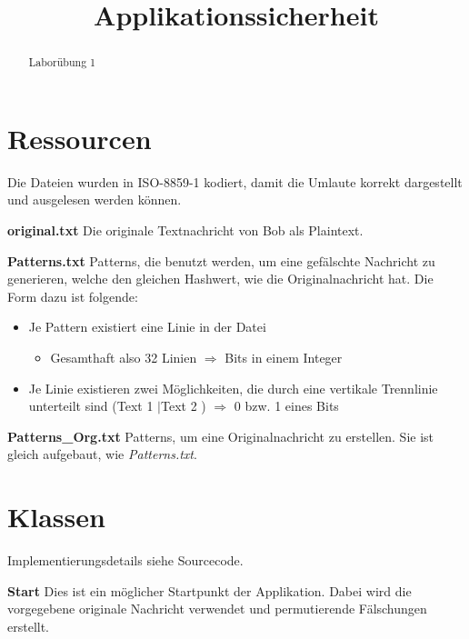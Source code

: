 \documentclass[12pt]{scrartcl}
\title{ %
Applikationssicherheit 
\vspace{0.2cm}
}
\begin{document}
 \maketitle
 \thispagestyle{firststyle}
 \pagestyle{firststyle}
 \begin{abstract}
 \begin{center}
 Laborübung 1
 \end{center}
 \vspace{0.5cm}
\hrulefill
\end{abstract}

 \pagestyle{documentstyle}
 \tableofcontents
 \pagebreak
\section{Ressourcen}
Die Dateien wurden in ISO-8859-1 kodiert, damit die Umlaute korrekt dargestellt und ausgelesen werden können.

\textbf{original.txt}\newline
Die originale Textnachricht von Bob als Plaintext.

\textbf{Patterns.txt}\newline
Patterns, die benutzt werden, um eine gefälschte Nachricht zu generieren, welche den gleichen Hashwert, wie die Originalnachricht hat.\newline
Die Form dazu ist folgende:
\begin{itemize}
\item Je Pattern existiert eine Linie in der Datei
\begin{itemize}
\item Gesamthaft also 32 Linien $\Longrightarrow$ Bits in einem Integer
\end{itemize}
\item Je Linie existieren zwei Möglichkeiten, die durch eine vertikale Trennlinie unterteilt sind (Text 1 $|$Text 2 ) $\Longrightarrow$ 0 bzw. 1 eines Bits
\end{itemize}

\textbf{Patterns\_Org.txt}\newline
Patterns, um eine Originalnachricht zu erstellen.\newline
Sie ist gleich aufgebaut, wie \textit{Patterns.txt}.

\section{Klassen}
Implementierungsdetails siehe Sourcecode.

\textbf{Start}\newline
Dies ist ein möglicher Startpunkt der Applikation. Dabei wird die vorgegebene originale Nachricht verwendet und permutierende Fälschungen erstellt.
\end{document}
